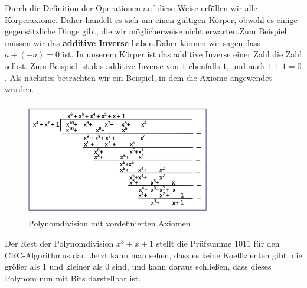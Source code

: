 \documentclass[course=erap]{aspdoc}
\begin{document}
Durch die Definition der Operationen auf diese Weise erfüllen wir alle Körperaxiome. Daher handelt es sich um einen gültigen Körper, obwohl es einige gegensätzliche Dinge gibt, die wir möglicherweise nicht erwarten.Zum Beispiel müssen wir das \textbf{additive Inverse} haben.Daher können wir sagen,dass $a + (-a) = 0$ ist. In unserem Körper ist das additive Inverse einer Zahl die Zahl selbst. Zum Beispiel ist das additive Inverse von $1$ ebenfalls $1$, und auch $1 + 1 = 0$. Als nächstes betrachten wir ein Beispiel, in dem die Axiome angewendet wurden. \\
\begin{figure}[H]
    \centering
    \includegraphics[width=8cm, height=5cm]{polynomialdivision}
    \caption{Polynomdivision mit vordefinierten Axiomen}
    \label{fig:enter-label}
\end{figure} 
Der Rest der Polynomdivision $x^3+x+1$  stellt die Prüfsumme $1 0 1 1$ für den CRC-Algorithmus dar. Jetzt kann man sehen, dass es keine Koeffizienten gibt, die größer als $1$ und kleiner als $0$ sind, und kann daraus schließen, dass dieses Polynom nun mit Bits darstellbar ist.
\end{document}
